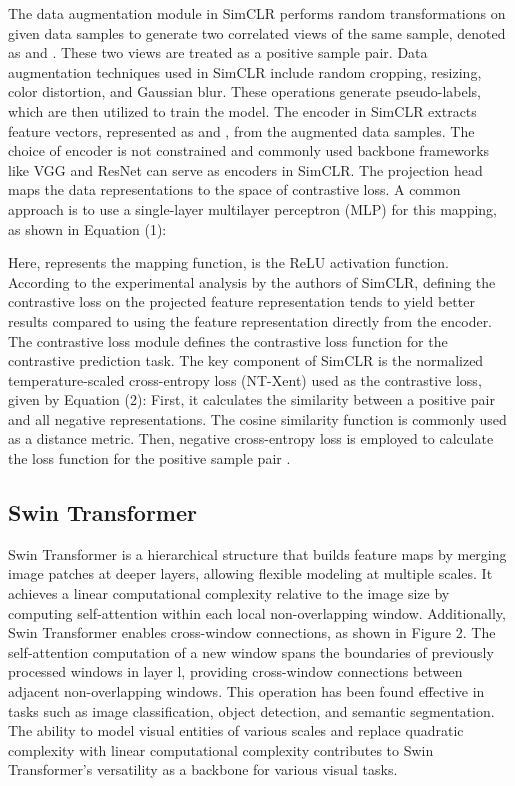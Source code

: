 \documentclass[10pt,twocolumn,letterpaper]{article}
\begin{document}
The data augmentation module in SimCLR performs random transformations on given data samples to generate two correlated views of the same sample, denoted as  and . These two views are treated as a positive sample pair. Data augmentation techniques used in SimCLR include random cropping, resizing, color distortion, and Gaussian blur. These operations generate pseudo-labels, which are then utilized to train the model.
The encoder in SimCLR extracts feature vectors, represented as  and , from the augmented data samples. The choice of encoder is not constrained and commonly used backbone frameworks like VGG and ResNet can serve as encoders in SimCLR.
The projection head maps the data representations to the space of contrastive loss. A common approach is to use a single-layer multilayer perceptron (MLP) for this mapping, as shown in Equation (1):

Here,  represents the mapping function,  is the ReLU activation function. According to the experimental analysis by the authors of SimCLR, defining the contrastive loss on the projected feature representation  tends to yield better results compared to using the feature representation  directly from the encoder.
The contrastive loss module defines the contrastive loss function for the contrastive prediction task. The key component of SimCLR is the normalized temperature-scaled cross-entropy loss (NT-Xent) used as the contrastive loss, given by Equation (2):
First, it calculates the similarity between a positive pair and all negative representations. The cosine similarity function is commonly used as a distance metric. Then, negative cross-entropy loss is employed to calculate the loss function for the positive sample pair .



\subsection{Swin Transformer}

Swin Transformer is a hierarchical structure that builds feature maps by merging image patches at deeper layers, allowing flexible modeling at multiple scales. It achieves a linear computational complexity relative to the image size by computing self-attention within each local non-overlapping window. Additionally, Swin Transformer enables cross-window connections, as shown in Figure 2. The self-attention computation of a new window spans the boundaries of previously processed windows in layer l, providing cross-window connections between adjacent non-overlapping windows. This operation has been found effective in tasks such as image classification, object detection, and semantic segmentation. The ability to model visual entities of various scales and replace quadratic complexity with linear computational complexity contributes to Swin Transformer's versatility as a backbone for various visual tasks.
\end{document}
